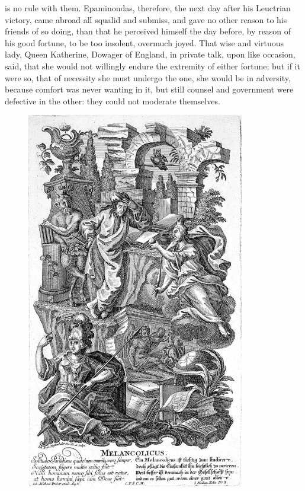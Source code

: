 {is no rule with them. Epaminondas, therefore, the next day after his
Leuctrian victory, came abroad all squalid and submiss, and gave
no other reason to his friends of so doing, than that he perceived
himself the day before, by reason of his good fortune, to be too
insolent, overmuch joyed. That wise and virtuous lady, Queen
Katherine, Dowager of England, in private talk, upon like occasion,
said, that she would not willingly endure the extremity of either
fortune; but if it were so, that of necessity she must undergo the one,
she would be in adversity, because comfort was never wanting in it, but
still counsel and government were defective in the other: they could
not moderate themselves.

\cleartoleftpage{}
\begin{figure}[p]
  \begingroup
  \centering
  \includegraphics[keepaspectratio,width=0.85\textwidth]{figures/scholar-small.jpg}
  \label{fig:scholar}
\end{figure}

}

